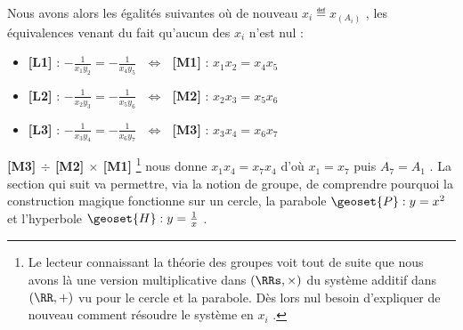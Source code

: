 \medskip

Nous avons alors les égalités suivantes où de nouveau $x_i \eqdef x_{(A_i)}$ , les équivalences venant du fait qu'aucun des $x_i$ n'est nul :
\begin{itemize}[label=\small\textbullet]
	\item \textbf{[L1]} : 
	      $- \frac{1}{x_1 y_2} = - \frac{1}{x_4 y_5}$
	      $\,\, \Longleftrightarrow \,\,$
	      \textbf{[M1]} : 
	      $x_1 x_{2} = x_{4} x_{5}$

	\item \textbf{[L2]} : 
	      $- \frac{1}{x_2 y_3} = - \frac{1}{x_5 y_6}$
	      $\,\, \Longleftrightarrow \,\,$
	      \textbf{[M2]} : 
	      $x_2 x_{3} = x_{5} x_{6}$

	\item \textbf{[L3]} : 
	      $- \frac{1}{x_3 y_4} = - \frac{1}{x_6 y_7}$
	      $\,\, \Longleftrightarrow \,\,$
	      \textbf{[M3]} : 
	      $x_3 x_{4} = x_{6} x_{7}$
\end{itemize}


\medskip

\textbf{[M3] $\div$ [M2] $\times$ [M1]}
\footnote{
	Le lecteur connaissant la théorie des groupes voit tout de suite que nous avons là une version multiplicative dans $(\RRs , \times)$ du système additif dans $(\RR , +)$ vu pour le cercle et la parabole.
	Dès lors nul besoin d'expliquer de nouveau comment résoudre le système en $x_i$ .
}
nous donne $x_1 x_4 = x_7 x_4$ d'où $x_1 = x_7$ puis $A_7 = A_1$ .
La section qui suit va permettre, via la notion de groupe, de comprendre pourquoi la construction magique fonctionne sur un cercle, la parabole $\geoset{P} : y = x^2$ et l'hyperbole $\geoset{H} : y = \frac{1}{x}$ .
